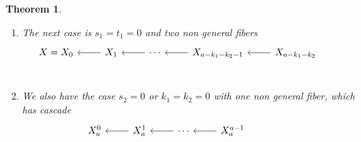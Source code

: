 \documentclass[12pt,a4paper]{book}      %
\newtheorem{thm}{Theorem}[section]
\theoremstyle{definition}
\begin{document}
\begin{thm}
\begin{enumerate}
\[\begin{tikzpicture}[baseline= (a).base]
\node[scale=.6] (a) at (0,0){
\begin{tikzcd}
        &               &                  &                                     &                                   &                                           & Y' \arrow[r] \arrow[rd]       & {Y_1^2}' \arrow[r] & \cdots \arrow[r] & {Y_{n_2'}^2}' \\
X = X_0 & X_1 \arrow[l] & \cdots \arrow[l] & X_{a-k_1-k_2-1} \arrow[l] \arrow[d] & X_{a-k_1-k_2} \arrow[l] \arrow[r] & X'_{a'-k_1'-k_2'-1} \arrow[rd] \arrow[ru] &                               & {Y_1^1}'           & \cdots \arrow[r] & {Y_{n_1'}^1}' \\
        &               &                  & Y \arrow[ld] \arrow[rd]             &                                   &                                           & X_{a'-k_1'-k_2'-2}' \arrow[r] & \cdots \arrow[r]   & X'_0             &               \\
        &               & Y_1^1 \arrow[d]  &                                     & Y_1^2 \arrow[d]                   &                                           &                               &                    &                  &               \\
        &               & \vdots \arrow[d] &                                     & \vdots \arrow[d]                  &                                           &                               &                    &                  &               \\
        &               & Y_{n_1}^1        &                                     & Y_{n_2}^2                         &                                           &                               &                    &                  &              
\end{tikzcd}
};
\end{tikzpicture}
\]
\item The next case is $s_1 = t_1 = 0$ and two non general fibers
\[
\begin{tikzcd}
X = X_0 & X_1 \arrow[l] & \cdots \arrow[l] & X_{a-k_1-k_2-1} \arrow[l] & X_{a-k_1-k_2} \arrow[l]  &  \\
\end{tikzcd}
\]
\item We also have the case $s_2 =0$ or $k_1 = k_2 = 0$ with one non general fiber, which has cascade
\[
\begin{tikzcd}
X_a^0 & X_a^1 \arrow[l ]  & \cdots \arrow[l]  & X_a^{a-1}  \arrow[l] &                                                           &                        \\

\end{tikzcd}\]
\end{enumerate}
\end{thm}
\end{document}
